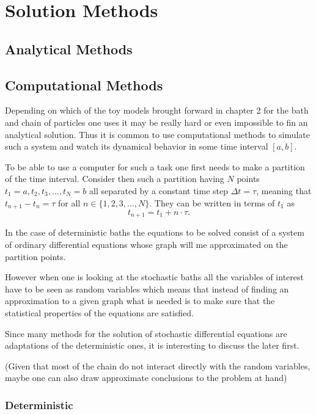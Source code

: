 
\chapter{Solution Methods}

\section{Analytical Methods}

\section{Computational Methods}

Depending on which of the toy models brought forward in chapter 2 for the bath and chain of particles one uses it may be really hard or even impossible to fin an analytical solution. Thus it is common to use computational methods to simulate such a system and watch its dynamical behavior in some time interval $ [a,b] $.

To be able to use a computer for such a task one first needs to make a partition of the time interval. Consider then such a partition having $ N $ points $ t_1=a, t_2, t_3, \dots, t_N=b $ all separated by a constant time step $ \Delta t = \tau $, meaning that $ t_{n+1} - t_{n} = \tau $ for all $ n\in \{1,2,3,\dots,N\} $. They can be written in terms of $ t_{1} $ as
$$ t_{n+1} = t_{1} + n\cdot \tau. $$

In the case of deterministic baths the equations to be solved consist of a system of ordinary differential equations whose graph will me approximated on the partition points.

However when one is looking at the stochastic baths all the variables of interest have to be seen as random variables which means that instead of finding an approximation to a given graph what is needed is to make sure that the statistical properties of the equations are satisfied.

Since many methods for the solution of stochastic differential equations are adaptations of the deterministic ones, it is interesting to discuss the later first.

(Given that most of the chain do not interact directly with the random variables, maybe one can also draw approximate conclusions to the problem at hand)

\subsection{Deterministic}

